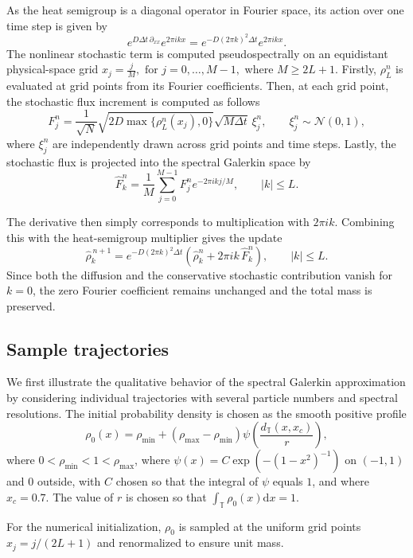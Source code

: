 \documentclass[a4paper,12pt]{article}
\newcommand{\mathd}{\mathrm{d}}
\newcommand{\T}{\mathbb{T}}
\begin{document}
As the heat semigroup is a diagonal operator in Fourier space, its action
over one time step is given by
\[
e^{D\Delta t\,\partial_{xx}}e^{2\pi ikx}
=
e^{-D(2\pi k)^2\Delta t}e^{2\pi ikx}.
\]
The nonlinear stochastic term is computed pseudospectrally on an
equidistant physical-space grid
\(
x_j=\frac{j}{M},
\text{ for } j=0,\ldots,M-1,
\)
where $M\geq 2L+1$. Firstly, $\rho_L^n$ is evaluated at grid points from its Fourier coefficients. 
Then, at each grid point, the stochastic flux increment is computed as follows
\[
F_j^n
=
\frac{1}{\sqrt{N}}
\sqrt{2D\max\{\rho_L^n(x_j),0\}}
\sqrt{M\Delta t}\,\xi_j^n,
\qquad
\xi_j^n\sim\mathcal{N}(0,1),
\]
where \(\xi_j^n\) are independently drawn across grid points and time
steps.
Lastly, the stochastic flux is projected into the spectral Galerkin space by 
\[
\widehat{F}_k^n
=
\frac{1}{M}
\sum_{j=0}^{M-1}
F_j^n e^{-2\pi ikj/M}, \qquad |k|\leq L.
\]

The derivative then simply corresponds to multiplication
with $2\pi ik$. 
Combining this with the heat-semigroup
multiplier gives the update
\[
\widehat{\rho}_k^{\,n+1}
=
e^{-D(2\pi k)^2\Delta t}
\left(
\widehat{\rho}_k^n
+
2\pi ik\,\widehat{F}_k^n
\right),
\qquad |k|\leq L.
\]
Since both the diffusion and the conservative stochastic contribution
vanish for $k=0$, the zero Fourier coefficient remains unchanged and the
total mass is preserved.

\subsection{Sample trajectories}\label{sect:sample_traj}

We first illustrate the qualitative behavior of the spectral Galerkin
approximation by considering individual trajectories with several particle
numbers and spectral resolutions. The initial probability density is chosen as the smooth positive profile
\begin{equation}\label{eq:positive_molifier}
\rho_0(x)
=
\rho_{\min}
+
(\rho_{\max}-\rho_{\min})
\psi\left(\frac{d_{\mathbb T}(x,x_c)}{r}\right),
\end{equation}
where $0<\rho_{\min}<1<\rho_{\max}$, where $\psi(x) = C \exp(-(1-x^2)^{-1})$ on $(-1,1)$ and $0$ outside, with $C$ chosen so that the integral of $\psi$ equals $1$, and where $x_c = 0.7$. The value of $r$ is chosen so that $\int_\T \rho_0(x) \mathd x = 1$.



For the numerical initialization, $\rho_0$ is sampled at the uniform grid
points $x_j=j/(2L+1)$ and 
renormalized to ensure unit mass.
\end{document}
